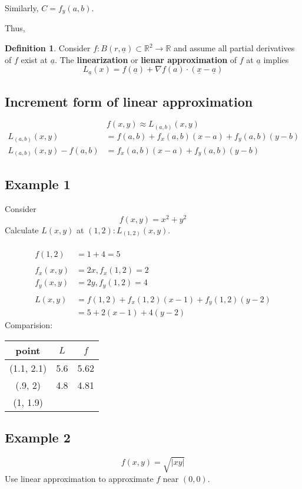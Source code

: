 \documentclass[12pt]{article}
\theoremstyle{definition}
\newtheorem{definition}{Definition}[section]
\newcommand{\R}{\mathbb{R}}
\begin{document}
Similarly, $C=f_y(a,b)$.

Thus,

\begin{definition}
    Consider $f:B(r,\underline a)\subset \R^2\to \R$ and assume all partial derivatives of $f$ exist at $\underline a$. The \textbf{linearization} or \textbf{lienar approximation} of $f$ at $\underline a$ implies\[L_{\underline a}(x)=f(\underline a)+\nabla f(a)\cdot(\underline x-\underline a)\]
\end{definition}

\subsection{Increment form of linear approximation}

\[f(x,y)\approx L_{(a,b)}(x,y)\]
\begin{align*}
    L_{(a,b)}(x,y)&=f(a,b)+f_x(a,b)(x-a)+f_y(a,b)(y-b)\\
    L_{(a,b)}(x,y)-f(a,b)&=f_x(a,b)(x-a)+f_y(a,b)(y-b)
\end{align*}

\subsection{Example 1}
Consider \[f(x,y)=x^2+y^2\]
Calculate $L(x,y)$ at $(1,2):L_{(1,2)}(x,y)$.\\\\
\begin{align*}
    f(1,2)&=1+4=5\\\\
    f_x(x,y)&=2x, f_x(1,2)=2\\
    f_y(x,y)&=2y, f_y(1,2)=4\\\\
    L(x,y)&=f(1,2)+f_x(1,2)(x-1)+f_y(1,2)(y-2)\\
    &=5+2(x-1)+4(y-2)
\end{align*}
Comparision:
\begin{tabular}{c|c|c}
    point & $L$ & $f$\\\hline
    (1.1, 2.1) & 5.6 & 5.62\\
    (.9, 2) & 4.8 & 4.81\\
    (1, 1.9) & \\
\end{tabular}

\subsection{Example 2}
\[f(x,y)=\sqrt{|xy|}\]
Use linear approximation to approximate $f$ near $(0,0)$.
\end{document}
